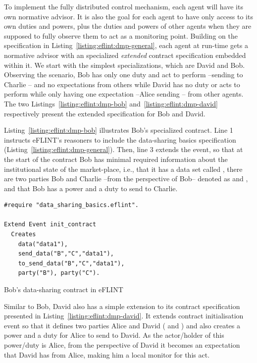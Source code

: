 To implement the fully distributed control mechanism, each agent will have its own normative advisor. It is also the goal for each agent to have only access to its own duties and powers, plus the duties and powers of other agents when they are supposed to fully observe them to act as a monitoring point. Building on the specification in Listing~\ref{listing:eflint:dmp-general}, each agent at run-time gets a normative advisor with an specialized \textit{extended} contract specification embedded within it. We start with the simplest specializations, which are David and Bob. Observing the scenario, Bob has only one duty and act to perform --sending  to Charlie -- and no expectations from others while David has no duty or acts to perform while only having one expectation --Alice sending -- from other agents. The two Listings~\ref{listing:eflint:dmp-bob} and~\ref{listing:eflint:dmp-david} respectively present the extended specification for Bob and David.


Listing~\ref{listing:eflint:dmp-bob} illustrates Bob's specialized contract. Line 1 instructs eFLINT's reasoners to include the data-sharing basics specification (Listing~\ref{listing:eflint:dmp-general}). Then, line 3 extends the  event, so that at the start of the contract Bob has minimal required information about the institutional state of the market-place, i.e., that it has a data set called , there are two parties Bob and Charlie --from the perspective of Bob-- denoted as  and , and that Bob has a power and a duty to send  to Charlie.

\begin{listing}[th]
\centering
\begin{tcolorbox}[left=2pt,right=2pt,top=2pt,bottom=2pt,arc=0pt,
                  boxrule=0pt,toprule=1pt,
                  colback=white]
\begin{verbatim}
#require "data_sharing_basics.eflint".

Extend Event init_contract
  Creates 
    data("data1"),
    send_data("B","C","data1"),
    to_send_data("B","C","data1"),
    party("B"), party("C").
\end{verbatim}
\end{tcolorbox}
\caption{Bob's data-sharing contract in eFLINT}
\label{listing:eflint:dmp-bob}
\end{listing}



Similar to Bob, David also has a simple extension to its contract specification presented in Listing~\ref{listing:eflint:dmp-david}. It extends contract initialisation event so that it defines two parties Alice and David ( and ) and also creates a power and a duty for Alice to send  to David. As the actor/holder of this power/duty is Alice, from the perspective of David it becomes an expectation that David has from Alice, making him a local monitor for this act.

